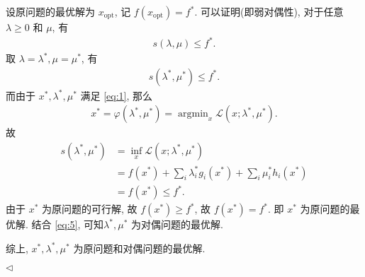 \documentclass[11pt]{article}
\newenvironment{answer}[1][Solution]{\begin{trivlist}
\item[\hskip \labelsep {\bfseries #1.}\hskip \labelsep]}{\hfill$\lhd$\end{trivlist}}
\newcommand\1{\mathds{1}}
\DeclareMathOperator*{\argmin}{argmin} %
\begin{document}
\begin{answer}
\begin{enumerate}
    设原问题的最优解为 $x_\text{opt}$, 记 $f(x_\text{opt}) = f^*$. 可以证明(即弱对偶性), 对于任意 $\lambda \ge 0$ 和 $\mu$, 有
    \begin{align}
        \label{eq:5}
        s(\lambda, \mu) \le f^*.
    \end{align}
    取 $\lambda = \lambda^*, \mu = \mu^*$, 有
    \begin{align*}
        s(\lambda^*, \mu^*) \le f^*.
    \end{align*}
    而由于 $x^*, \lambda^*, \mu^*$ 满足 \eqref{eq:1}, 那么
    \begin{align*}
        x^* = \varphi(\lambda^*, \mu^*) = \argmin_x \mathcal{L}(x;\lambda^*, \mu^*).
    \end{align*}
    故
    \begin{align*}
        s(\lambda^*, \mu^*) &= \inf_x \mathcal{L}(x;\lambda^*, \mu^*) \\
        &= f(x^*) + \sum_i \lambda_i^* g_i(x^*) + \sum_i \mu_i^* h_i(x^*) \\
        &= f(x^*) \le f^*.
    \end{align*}
    由于 $x^*$ 为原问题的可行解, 故 $f(x^*) \ge f^*$, 故 $f(x^*) = f^*$. 即 $x^*$ 为原问题的最优解. 结合 \eqref{eq:5}, 可知$\lambda^*, \mu^*$ 为对偶问题的最优解.
    
    综上, $x^*, \lambda^*, \mu^*$ 为原问题和对偶问题的最优解.
\end{enumerate}
\end{answer}
\end{document}
